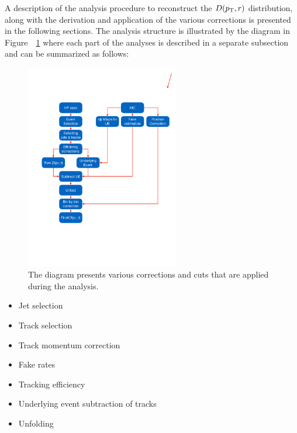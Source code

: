 
A description of the analysis procedure to reconstruct the $\mbox{$D( \mbox{$p_{\mathrm{T}}$}, r)$}$ distribution, along with the derivation and application of the various corrections is presented in the following sections.
The analysis structure is illustrated by the diagram in Figure~~\ref{fig:analysis_flow} where each part of the analyses is described in a separate subsection and can be summarized as follows: 


\begin{figure}
\centering
\includegraphics[width=0.6\textwidth]{figures/main/general/Shape_analyses_flow}
\caption{The diagram presents various corrections and cuts that are applied during the analysis.}
\label{fig:analysis_flow}
\end{figure}


\begin{itemize}
\item Jet selection
\item Track selection
\item Track momentum correction
\item Fake rates
\item Tracking efficiency
\item Underlying event subtraction of tracks
\item Unfolding
\end{itemize}




